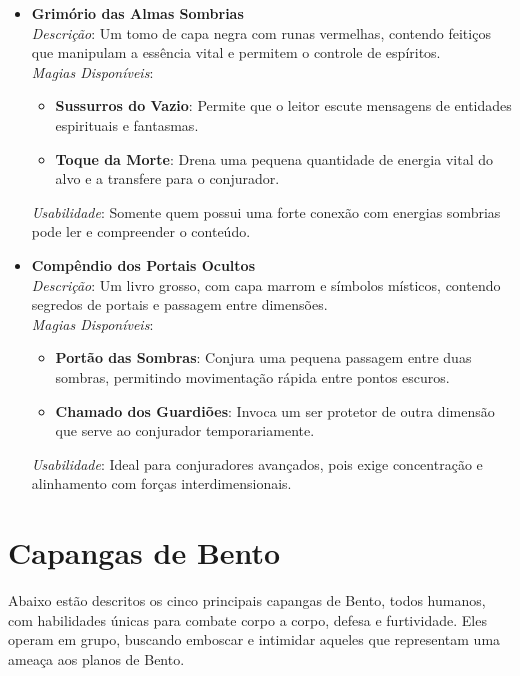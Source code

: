 \begin{itemize}
    \item \textbf{Grimório das Almas Sombrias} \\
    \textit{Descrição}: Um tomo de capa negra com runas vermelhas, contendo feitiços que manipulam a essência vital e permitem o controle de espíritos. \\
    \textit{Magias Disponíveis}:
    \begin{itemize}
        \item \textbf{Sussurros do Vazio}: Permite que o leitor escute mensagens de entidades espirituais e fantasmas.
        \item \textbf{Toque da Morte}: Drena uma pequena quantidade de energia vital do alvo e a transfere para o conjurador.
    \end{itemize}
    \textit{Usabilidade}: Somente quem possui uma forte conexão com energias sombrias pode ler e compreender o conteúdo.

    \item \textbf{Compêndio dos Portais Ocultos} \\
    \textit{Descrição}: Um livro grosso, com capa marrom e símbolos místicos, contendo segredos de portais e passagem entre dimensões. \\
    \textit{Magias Disponíveis}:
    \begin{itemize}
        \item \textbf{Portão das Sombras}: Conjura uma pequena passagem entre duas sombras, permitindo movimentação rápida entre pontos escuros.
        \item \textbf{Chamado dos Guardiões}: Invoca um ser protetor de outra dimensão que serve ao conjurador temporariamente.
    \end{itemize}
    \textit{Usabilidade}: Ideal para conjuradores avançados, pois exige concentração e alinhamento com forças interdimensionais.
\end{itemize}


\section{Capangas de Bento}

Abaixo estão descritos os cinco principais capangas de Bento, todos humanos, com habilidades únicas para combate corpo a corpo, defesa e furtividade. Eles operam em grupo, buscando emboscar e intimidar aqueles que representam uma ameaça aos planos de Bento.

